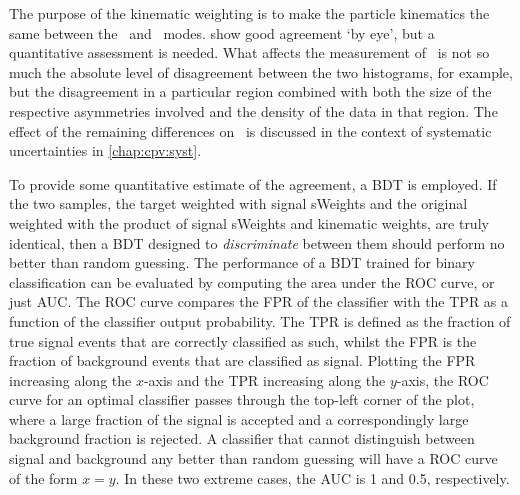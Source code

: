 The purpose of the kinematic weighting is to make the particle kinematics the
same between the \pKK\ and \ppipi\ modes.
show good agreement `by eye', but a quantitative assessment is needed.
What affects the measurement of \dACP\ is not so much the absolute level of
disagreement between the two histograms, for example, but the disagreement in a
particular region combined with both the size of the respective asymmetries
involved and the density of the data in that region.
The effect of the remaining differences on \dACP\ is discussed in the context
of systematic uncertainties in \cref{chap:cpv:syst}.

To provide some quantitative estimate of the agreement, a \ac{BDT} is employed.
If the two samples, the target weighted with signal sWeights and the original
weighted with the product of signal sWeights and kinematic weights, are truly
identical, then a \ac{BDT} designed to \emph{discriminate} between them should
perform no better than random guessing.
The performance of a \ac{BDT} trained for binary classification can be
evaluated by computing the area under the \ac{ROC} curve, or just \ac{AUC}.
The \ac{ROC} curve compares the \ac{FPR} of the classifier with the \ac{TPR} as
a function of the classifier output probability.
The \ac{TPR} is defined as the fraction of true signal events that are
correctly classified as such, whilst the \ac{FPR} is the fraction of background
events that are classified as signal.
Plotting the \ac{FPR} increasing along the $x$-axis and the \ac{TPR} increasing
along the $y$-axis, the \ac{ROC} curve for an optimal classifier passes through
the top-left corner of the plot, where a large fraction of the signal is
accepted and a correspondingly large background fraction is rejected.
A classifier that cannot distinguish between signal and background any better
than random guessing will have a \ac{ROC} curve of the form $x = y$.
In these two extreme cases, the \ac{AUC} is 1 and 0.5, respectively.

